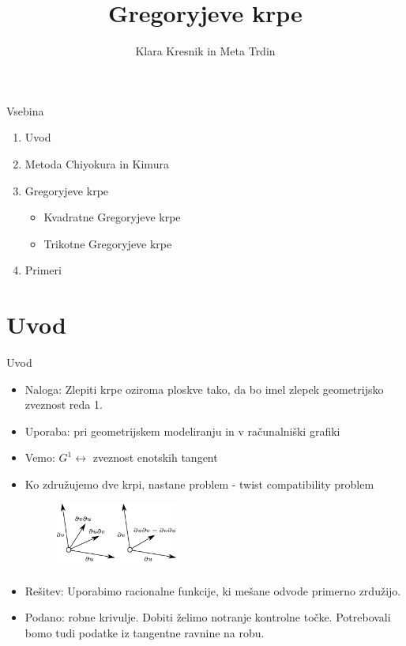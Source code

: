 \documentclass[a4paper,8pt]{beamer}
\title{Gregoryjeve krpe}
\author{Klara Kresnik in Meta Trdin} %
\institute[FMF]{Fakulteta za matematiko in fiziko}
\date{}
\begin{document}
\begin{frame}
\maketitle
\end{frame}

\begin{frame}{Vsebina}

\fontsize{14pt}{7.2}\selectfont

\begin{enumerate}
	\item Uvod
	\item Metoda Chiyokura in Kimura
	\item Gregoryjeve krpe
	\begin{itemize}
		\fontsize{10pt}{7.2}\selectfont
		\item Kvadratne Gregoryjeve krpe
		\item Trikotne Gregoryjeve krpe
	\end{itemize}
    \item Primeri
\end{enumerate}

\end{frame}

\section{Uvod}
\begin{frame}{Uvod}
\begin{itemize}
	\item Naloga: Zlepiti krpe oziroma ploskve tako, da bo imel zlepek geometrijsko zveznost reda 1. 
	\item Uporaba: pri geometrijskem modeliranju in v računalniški 	grafiki
	
	\item Vemo: $G^1 \leftrightarrow$ zveznost enotskih tangent
	\item Ko združujemo dve krpi, nastane problem - twist compatibility problem
	\pause
	\begin{figure}[h]
		\centering
		\includegraphics[width=4cm]{mesani_odvodi_ob.jpg}
	\end{figure}
	
	\item Rešitev: Uporabimo racionalne funkcije, ki mešane odvode primerno zrdužijo.
	\item Podano: robne krivulje. Dobiti želimo notranje kontrolne točke. Potrebovali bomo tudi podatke iz tangentne ravnine na robu.

	
\end{itemize}

\end{frame}
\end{document}
